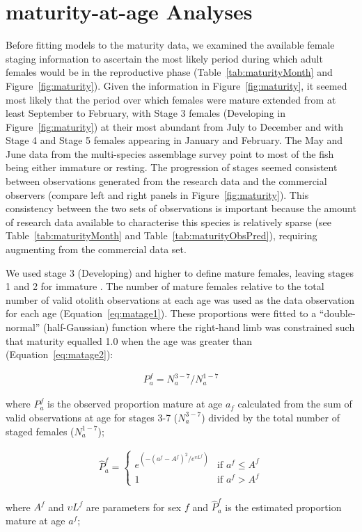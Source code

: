 \section{maturity-at-age Analyses}

Before fitting models to the maturity data, we examined the available female \fishname staging information to ascertain the most likely period during which adult females would be in the reproductive phase (Table~\ref{tab:maturityMonth} and Figure~\ref{fig:maturity}). Given the information in Figure~\ref{fig:maturity}, it seemed most likely that the period over which females were mature extended from at least September to February, with Stage 3 females (Developing in Figure~\ref{fig:maturity}) at their most abundant from July to December and with Stage 4 and Stage 5 females appearing in January and February. The May and June data from the multi-species assemblage survey point to most of the fish being either immature or resting.  The progression of stages seemed consistent between observations generated from the research data and the commercial observers (compare left and right panels in Figure~\ref{fig:maturity}). This consistency between the two sets of observations is important because the amount of research data available to characterise this species is relatively sparse (see Table~\ref{tab:maturityMonth} and Table~\ref{tab:maturityObsPred}), requiring augmenting from the commercial data set.

We used stage 3 (Developing) and higher to define mature females, leaving stages 1 and 2 for immature \fishname. The number of mature females relative to the total number of valid otolith observations at each age was used as the data observation for each age (Equation~\ref{eq:matage1}). These proportions were fitted to a “double-normal” (half-Gaussian) function where the right-hand limb was constrained such that maturity equalled 1.0 when the age was greater than (Equation~\ref{eq:matage2}):

\begin{align} \label{eq:matage1}
P_a^f=N_a^{3-7}/N_a^{1-7}
\end{align}
\begin{addmargin}[3em]{1em}
where $P_a^f$ is the observed proportion mature at age $a_f$ calculated from the sum of valid observations at age for stages 3-7 ($N_a^{3-7}$) divided by the total number of staged females ($N_a^{1-7}$);
\end{addmargin}

\begin{align} \label{eq:matage2}
\hat{P}_a^f=
  \begin{cases}
    e^{\left(-\left(a^f-A^f\right)^2/e^{{\upsilon}L^f}\right)} & \text{if } a^f \leq A^f \\
                                              1 & \text{if } a^f > A^f
  \end{cases}
\end{align}
\begin{addmargin}[3em]{1em}
where $A^f$ and ${\upsilon}L^f$ are parameters for sex $f$ and $\hat{P}_a^f$ is the estimated proportion mature at age $a^f$;
\end{addmargin}

